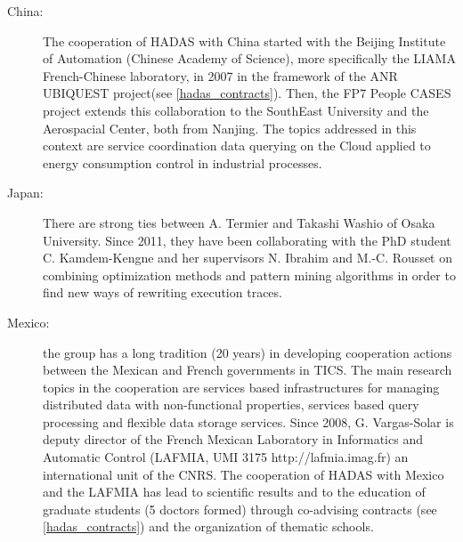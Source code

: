 \begin{description}

\item[China:] The cooperation of HADAS with China started with the Beijing Institute of Automation (Chinese Academy of Science), more specifically the LIAMA French-Chinese laboratory, in 2007 in the framework of the ANR UBIQUEST project(see \ref{hadas_contracts}). Then, the FP7 People CASES project extends this collaboration to the SouthEast University and the Aerospacial Center, both from Nanjing. The topics addressed in this context are service coordination data querying on the  Cloud applied to energy consumption control in industrial processes. 

\item[Japan:] 
There are strong ties between A. Termier and Takashi Washio of Osaka University. Since 2011, they have been collaborating with the PhD student C. Kamdem-Kengne and her supervisors N. Ibrahim and M.-C. Rousset on combining optimization methods and pattern mining algorithms in order to find new ways of rewriting execution traces.

\item[Mexico:] the group has a long tradition (20 years) in developing cooperation actions between the Mexican and French governments in TICS. 
The main research topics in the cooperation are services based infrastructures for managing distributed data with non-functional properties, services based query processing and flexible data storage services.  
Since 2008, G. Vargas-Solar is deputy director of the French Mexican Laboratory in Informatics and Automatic Control (LAFMIA, UMI 3175 http://lafmia.imag.fr) an international unit of the CNRS.  The cooperation of HADAS with Mexico and the LAFMIA has lead to scientific results and to the education of graduate students (5 doctors formed) through co-advising contracts (see \ref{hadas_contracts}) and the organization of thematic schools. 


\end{description}
